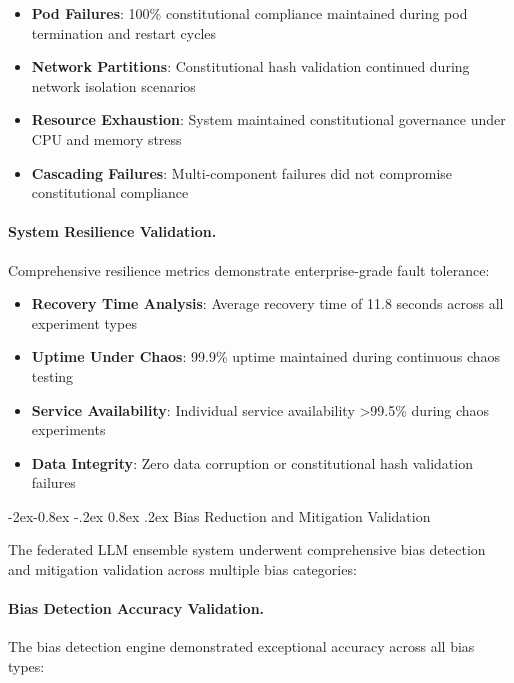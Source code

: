 \documentclass[manuscript,screen,9pt]{acmart}
\makeatletter
\renewcommand\subsubsection{\@startsection{subsubsection}{3}{\z@}%
  {-2ex\@plus -0.8ex \@minus -.2ex}%
  {0.8ex \@plus .2ex}%
  {\normalfont\normalsize\bfseries}}
\makeatother
\begin{document}
\begin{itemize}[itemsep=1pt,parsep=1pt]
    \item \textbf{Pod Failures}: 100\% constitutional compliance maintained during pod termination and restart cycles
    \item \textbf{Network Partitions}: Constitutional hash validation continued during network isolation scenarios
    \item \textbf{Resource Exhaustion}: System maintained constitutional governance under CPU and memory stress
    \item \textbf{Cascading Failures}: Multi-component failures did not compromise constitutional compliance
\end{itemize}

\paragraph{System Resilience Validation.} Comprehensive resilience metrics demonstrate enterprise-grade fault tolerance:

\begin{itemize}[itemsep=1pt,parsep=1pt]
    \item \textbf{Recovery Time Analysis}: Average recovery time of 11.8 seconds across all experiment types
    \item \textbf{Uptime Under Chaos}: 99.9\% uptime maintained during continuous chaos testing
    \item \textbf{Service Availability}: Individual service availability >99.5\% during chaos experiments
    \item \textbf{Data Integrity}: Zero data corruption or constitutional hash validation failures
\end{itemize}

\subsubsection{Bias Reduction and Mitigation Validation}
\label{subsubsec:bias_reduction_validation}

The federated LLM ensemble system underwent comprehensive bias detection and mitigation validation across multiple bias categories:

\paragraph{Bias Detection Accuracy Validation.} The bias detection engine demonstrated exceptional accuracy across all bias types:
\end{document}
